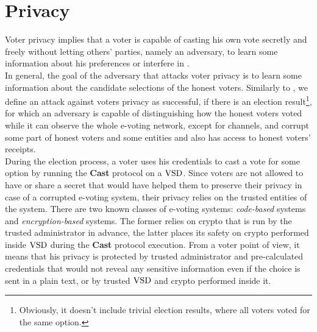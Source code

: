 \chapter{Privacy}

Voter privacy implies that a voter is capable of casting his own vote secretly and freely without letting others' parties, namely an adversary, to learn some information about his preferences or interfere in .\\

In general, the goal of the adversary that attacks voter privacy is to learn some information about the candidate selections of the honest voters. Similarly to \cite{Kiayias2015}, we define an attack against voters privacy as successful, if there is an election result\footnote{Obviously, it doesn't include trivial election results, where all voters voted for the same option. }, for which an adversary is capable of distinguishing how the honest voters voted while it can observe the whole e-voting network, except for  channels, and corrupt some part of honest voters and some entities and also has access to honest voters' receipts. \\

During the election process, a voter uses his credentials to cast a vote for some option by running the \textbf{Cast} protocol on a $\operatorname{VSD}$. Since voters are not allowed to have or share a secret that would have helped them to preserve their privacy in case of a corrupted e-voting system, their privacy relies on the trusted entities of the system. There are two  known classes of e-voting systems: \emph{code-based} systems and \emph{encryption-based} systems. The former relies on crypto that is run by the trusted administrator in advance, the latter places its safety on crypto performed inside $\operatorname{VSD}$ during the \textbf{Cast} protocol execution. From a voter point of view, it means that his privacy is protected by trusted administrator and pre-calculated credentials that would not reveal any sensitive information even if the choice is sent in a plain text, or by trusted $\operatorname{VSD}$ and crypto performed inside it. \\

